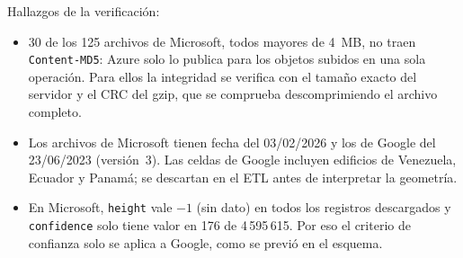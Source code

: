 Hallazgos de la verificación:
\begin{itemize}
  \item 30 de los 125 archivos de Microsoft, todos mayores de 4~MB, no traen \texttt{Content-MD5}: Azure solo lo publica para los objetos subidos en una sola operación. Para ellos la integridad se verifica con el tamaño exacto del servidor y el CRC del gzip, que se comprueba descomprimiendo el archivo completo.
  \item Los archivos de Microsoft tienen fecha del 03/02/2026 y los de Google del 23/06/2023 (versión~3). Las celdas de Google incluyen edificios de Venezuela, Ecuador y Panamá; se descartan en el ETL antes de interpretar la geometría.
  \item En Microsoft, \texttt{height} vale $-1$ (sin dato) en todos los registros descargados y \texttt{confidence} solo tiene valor en 176 de 4\,595\,615. Por eso el criterio de confianza solo se aplica a Google, como se previó en el esquema.
\end{itemize}
